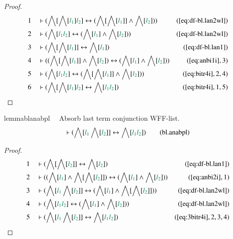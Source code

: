 \begin{proof}
\begin{align}
  1 &&  & \vdash ( \bigwedge[ \bigwedge[ \mwl{l_1} ] \mwl{l_2} ]
      \leftrightarrow ( \bigwedge[ \bigwedge[ \mwl{l_1} ] ]
      \wedge \bigwedge[ \mwl{l_2} ] )
      )&(\mbox{\ref{eq:df-bl.lan2wl}})\notag
  \\ 2 &&  & \vdash ( \bigwedge[ \mwl{l_1} \mwl{l_2} ] \leftrightarrow (
      \bigwedge[ \mwl{l_1} ] \wedge \bigwedge[ \mwl{l_2} ]
      ) )&(\mbox{\ref{eq:df-bl.lan2wl}})\notag
  \\ 3 &&  & \vdash ( \bigwedge[ \bigwedge[ \mwl{l_1} ] ] \leftrightarrow
      \bigwedge[ \mwl{l_1} ]
      )&(\mbox{\ref{eq:df-bl.lan1}})\notag
  \\ 4 &&  & \vdash ( ( \bigwedge[ \bigwedge[ \mwl{l_1} ] ] \wedge \bigwedge[
      \mwl{l_2} ] ) \leftrightarrow ( \bigwedge[ \mwl{l_1}
      ] \wedge \bigwedge[ \mwl{l_2} ] )
      )&(\mbox{\ref{eq:anbi1i}},3)\notag
  \\ 5 &&  & \vdash ( \bigwedge[ \mwl{l_1} \mwl{l_2} ] \leftrightarrow (
      \bigwedge[ \bigwedge[ \mwl{l_1} ] ] \wedge \bigwedge[
      \mwl{l_2} ] ) )&(\mbox{\ref{eq:bitr4i}},2,4)\notag
  \\ 6 &&  & \vdash ( \bigwedge[ \bigwedge[ \mwl{l_1} ] \mwl{l_2} ]
      \leftrightarrow \bigwedge[ \mwl{l_1} \mwl{l_2} ]
      )&(\mbox{\ref{eq:bitr4i}},1,5)\notag
\end{align}
\end{proof}

\begin{restatable}{lemma}{blanabpl}~~ Absorb last term conjunction WFF-list.
\begin{align}
\vdash ( \bigwedge[ \mwl{l_1} \bigwedge[ \mwl{l_2} ] ] \leftrightarrow
    \bigwedge[ \mwl{l_1} \mwl{l_2} ] )\label{eq:bl.anabpl}\tag{bl.anabpl}
\end{align}
\end{restatable}

\begin{proof}
\begin{align}
  1 &&  & \vdash ( \bigwedge[ \bigwedge[ \mwl{l_2} ] ] \leftrightarrow
      \bigwedge[ \mwl{l_2} ]
      )&(\mbox{\ref{eq:df-bl.lan1}})\notag
  \\ 2 &&  & \vdash ( ( \bigwedge[ \mwl{l_1} ] \wedge \bigwedge[ \bigwedge[
      \mwl{l_2} ] ] ) \leftrightarrow ( \bigwedge[
      \mwl{l_1} ] \wedge \bigwedge[ \mwl{l_2} ] )
      )&(\mbox{\ref{eq:anbi2i}},1)\notag
  \\ 3 &&  & \vdash ( \bigwedge[ \mwl{l_1} \bigwedge[ \mwl{l_2} ] ]
      \leftrightarrow ( \bigwedge[ \mwl{l_1} ] \wedge
      \bigwedge[ \bigwedge[ \mwl{l_2} ] ] )
      )&(\mbox{\ref{eq:df-bl.lan2wl}})\notag
  \\ 4 &&  & \vdash ( \bigwedge[ \mwl{l_1} \mwl{l_2} ] \leftrightarrow (
      \bigwedge[ \mwl{l_1} ] \wedge \bigwedge[ \mwl{l_2} ]
      ) )&(\mbox{\ref{eq:df-bl.lan2wl}})\notag
  \\ 5 &&  & \vdash ( \bigwedge[ \mwl{l_1} \bigwedge[ \mwl{l_2} ] ]
      \leftrightarrow \bigwedge[ \mwl{l_1} \mwl{l_2} ]
      )&(\mbox{\ref{eq:3bitr4i}},2,3,4)\notag
\end{align}
\end{proof}

